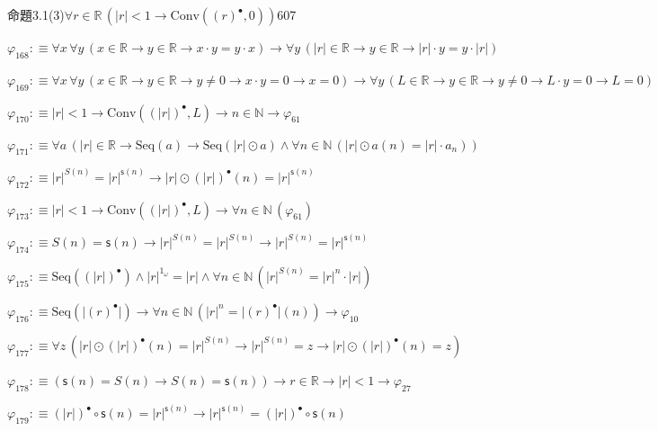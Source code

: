 \begin{fullproof}{命題3.1(3)}{$\forall r \in \mathbb{R}\,(\lvert r \rvert < 1 \to \mathrm{Conv}({(r)^{\bullet}},0))$}{607}
\begin{abbrevlist}
\item $\varphi_{168} :\equiv \forall x\,\forall y\,(x \in \mathbb{R} \to y \in \mathbb{R} \to x \cdot y = y \cdot x) \to \forall y\,(\lvert r \rvert \in \mathbb{R} \to y \in \mathbb{R} \to \lvert r \rvert \cdot y = y \cdot \lvert r \rvert)$
\item $\varphi_{169} :\equiv \forall x\,\forall y\,(x \in \mathbb{R} \to y \in \mathbb{R} \to y \neq 0 \to x \cdot y = 0 \to x = 0) \to \forall y\,(L \in \mathbb{R} \to y \in \mathbb{R} \to y \neq 0 \to L \cdot y = 0 \to L = 0)$
\item $\varphi_{170} :\equiv \lvert r \rvert < 1 \to \mathrm{Conv}({(\lvert r \rvert)^{\bullet}},L) \to n \in \mathbb{N} \to \varphi_{61}$
\item $\varphi_{171} :\equiv \forall a\,(\lvert r \rvert \in \mathbb{R} \to \mathrm{Seq}(a) \to \mathrm{Seq}(\lvert r \rvert \odot a) \land \forall n \in \mathbb{N}\,(\lvert r \rvert \odot a(n) = \lvert r \rvert \cdot a_{n}))$
\item $\varphi_{172} :\equiv {{\lvert r \rvert}^{S(n)}} = {{\lvert r \rvert}^{\mathsf{s}(n)}} \to \lvert r \rvert \odot {(\lvert r \rvert)^{\bullet}}(n) = {{\lvert r \rvert}^{\mathsf{s}(n)}}$
\item $\varphi_{173} :\equiv \lvert r \rvert < 1 \to \mathrm{Conv}({(\lvert r \rvert)^{\bullet}},L) \to \forall n \in \mathbb{N}\,(\varphi_{61})$
\item $\varphi_{174} :\equiv S(n) = \mathsf{s}(n) \to {{\lvert r \rvert}^{S(n)}} = {{\lvert r \rvert}^{S(n)}} \to {{\lvert r \rvert}^{S(n)}} = {{\lvert r \rvert}^{\mathsf{s}(n)}}$
\item $\varphi_{175} :\equiv \mathrm{Seq}({(\lvert r \rvert)^{\bullet}}) \land {{\lvert r \rvert}^{1_{\omega}}} = \lvert r \rvert \land \forall n \in \mathbb{N}\,({{\lvert r \rvert}^{S(n)}} = {{\lvert r \rvert}^{n}} \cdot \lvert r \rvert)$
\item $\varphi_{176} :\equiv \mathrm{Seq}(\lvert {(r)^{\bullet}} \rvert) \to \forall n \in \mathbb{N}\,({{\lvert r \rvert}^{n}} = \lvert {(r)^{\bullet}} \rvert(n)) \to \varphi_{10}$
\item $\varphi_{177} :\equiv \forall z\,(\lvert r \rvert \odot {(\lvert r \rvert)^{\bullet}}(n) = {{\lvert r \rvert}^{S(n)}} \to {{\lvert r \rvert}^{S(n)}} = z \to \lvert r \rvert \odot {(\lvert r \rvert)^{\bullet}}(n) = z)$
\item $\varphi_{178} :\equiv (\mathsf{s}(n) = S(n) \to S(n) = \mathsf{s}(n)) \to r \in \mathbb{R} \to \lvert r \rvert < 1 \to \varphi_{27}$
\item $\varphi_{179} :\equiv {(\lvert r \rvert)^{\bullet}} \circ \mathsf{s}(n) = {{\lvert r \rvert}^{\mathsf{s}(n)}} \to {{\lvert r \rvert}^{\mathsf{s}(n)}} = {(\lvert r \rvert)^{\bullet}} \circ \mathsf{s}(n)$

\end{abbrevlist}
\end{fullproof}
